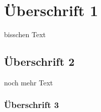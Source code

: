 \documentclass[11pt,oneside,a4paper,parskip]{scrartcl}
\title{\TITLE}
\author{\AUTHOR}
\date{\DATE}
\let\stdsection\section
\renewcommand\section{\newpage\stdsection}
\begin{document}
\begin{titlepage}
  \maketitle
  \thispagestyle{empty}
\end{titlepage}


\tableofcontents
\setcounter{page}{1}





\section{Überschrift 1} 
bisschen Text 
\subsection{Überschrift 2 } 
noch mehr Text 
\subsubsection{Überschrift 3} 
\end{document}
